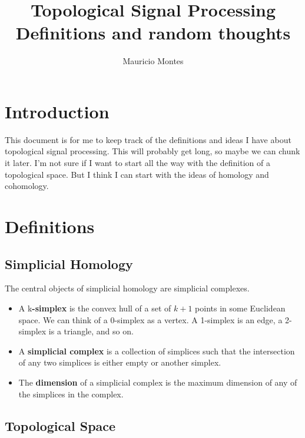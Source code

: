 \documentclass[12pt]{article}
\author{Mauricio Montes}
\title{Topological Signal Processing Definitions and random thoughts}
\begin{document}
\maketitle

\section{Introduction}

This document is for me to keep track of the definitions and ideas I have about topological signal
processing. This will probably get long, so maybe we can chunk it later. I'm not sure if I want to
start all the way with the definition of a topological space. But I think I can start with the ideas
of homology and cohomology. 

\section{Definitions}

\subsection{Simplicial Homology}

The central objects of simplicial homology are simplicial complexes.

\begin{itemize}

\item A k\textbf{-simplex} is the convex hull of a set of $k+1$ points in some Euclidean space. We can think of a 0-simplex as a
vertex. A 1-simplex is an edge, a 2-simplex is a triangle, and so on.


\item A \textbf{simplicial complex} is a collection of simplices such that the intersection of any two simplices is either empty or
another simplex.


\item The \textbf{dimension} of a simplicial complex is the maximum dimension of any of the simplices in the complex. 

\end{itemize}

\subsection{Topological Space}
\end{document}
